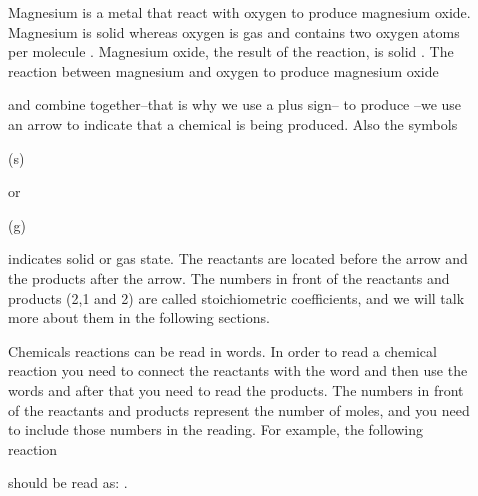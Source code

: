 \documentclass[main.tex]{subfiles}
\begin{document}
\begin{description}
\item[] Magnesium is a metal that react with oxygen to produce magnesium oxide. Magnesium is solid  whereas oxygen is gas and contains two oxygen atoms per molecule . Magnesium oxide, the result of the reaction, is solid . The reaction between magnesium and oxygen to produce magnesium oxide
\begin{center}\end{center}
 and  combine together--that is why we use a plus sign-- to produce --we use an arrow to indicate that a chemical is being produced. Also the symbols \begin{it}(s)\end{it} or \begin{it}(g)\end{it} indicates solid or gas state. The reactants are located before the arrow and the products after the arrow. The numbers in front of the reactants and products (2,1 and 2) are called stoichiometric coefficients, and we will talk more about them in the following sections.
\item[]
Chemicals reactions can be read in words. In order to read a chemical reaction you need to connect the reactants with the word  and then use the words  and after that you need to read the products. The numbers in front of the reactants and products represent the number of moles, and you need to include those numbers in the reading. For example, the following reaction
\begin{center}\end{center}
should be read as: . 


\end{description}
\end{document}
